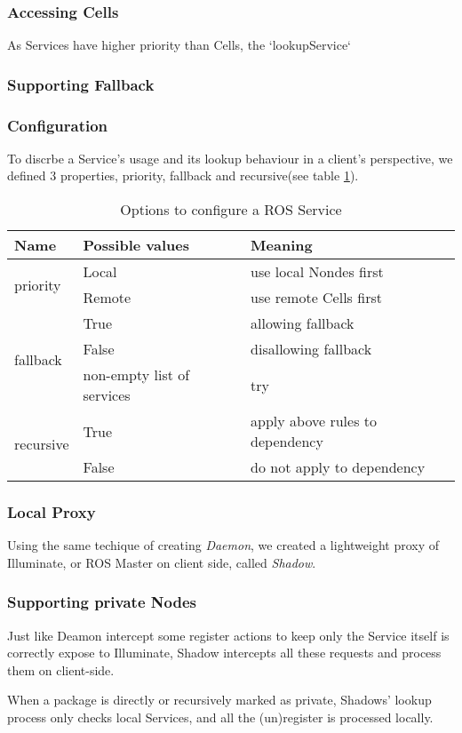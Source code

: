 \subsubsection{Accessing Cells}
As Services have higher priority than Cells, the `lookupService`

\subsubsection{Supporting Fallback}

\subsubsection{Configuration}
To discrbe a Service's usage and its lookup behaviour in
a client's perspective, we defined 3 properties, priority,
fallback and recursive(see table \ref{table:srv-opt}).

\begin{table}
  \renewcommand{\arraystretch}{1.3}
  \caption{Options to configure a ROS Service}
  \label{table:srv-opt}
  \centering
  \begin{tabular}{|l|l|l|}
    \hline
    \bfseries Name & \bfseries Possible values & \bfseries Meaning \\
    \hline
    \multirow{2}{*}{priority}  & Local  & use local Nondes first \\
    \cline{2-3}
                               & Remote & use remote Cells first \\
    \hline
    \multirow{3}{*}{fallback}  & True   & allowing fallback \\
    \cline{2-3}
                               & False  & disallowing fallback \\
    \cline{2-3}
                               & non-empty list of services & try  \\
    \hline
    \multirow{2}{*}{recursive} & True   & apply above rules to dependency \\
    \cline{2-3}
                               & False  & do not apply to dependency \\
    \hline
  \end{tabular}
\end{table} 

\subsubsection{Local Proxy}
Using the same techique of creating \emph{Daemon}, we created a lightweight
proxy of Illuminate, or ROS Master on client side, called \emph{Shadow}.

\subsubsection{Supporting private Nodes}
Just like Deamon intercept some register actions to keep only the Service itself is
correctly expose to Illuminate, Shadow intercepts all these requests and process them
on client-side.

When a package is directly or recursively marked as private, Shadows' lookup 
process only checks local Services, and all the (un)register is processed locally.



